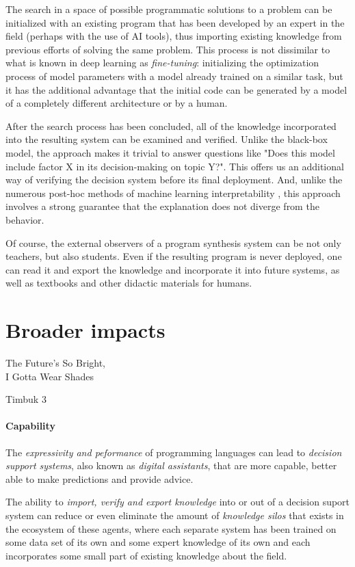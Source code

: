 The search in a space of possible programmatic solutions to a problem can be initialized with an existing program that has been developed by an expert in the field (perhaps with the  use of AI tools), thus \textcolor{accent}{importing existing knowledge} from previous efforts of solving the same problem.
This process is not dissimilar to what is known in deep learning as \emph{fine-tuning}: initializing the optimization process of model parameters with a model already trained on a similar task, but it has the additional advantage that the initial code can be generated by a model of a completely different architecture or by a human.

After the search process has been concluded, all of the knowledge incorporated into the resulting system can be \textcolor{accent}{examined and verified}. 
Unlike the black-box model, the approach makes it trivial to answer questions like "Does this model include factor X in its decision-making on topic Y?".
This offers us an additional way of verifying the decision system before its final deployment. 
And, unlike the numerous post-hoc methods of machine learning interpretability \cite{linardatosExplainableAiReview2020}, this approach involves a strong guarantee that the explanation does not diverge from the behavior.

Of course, the external observers of a program synthesis system can be not only teachers, but also students. 
Even if the resulting program is never deployed, one can read it and \textcolor{accent}{export the knowledge} and incorporate it into future systems, as well as textbooks and other didactic materials for humans.

\newpage
\section{Broader impacts}

\epigraph{The Future's So Bright, \\ I Gotta Wear Shades}{Timbuk 3}

\paragraph{Capability}

The \emph{expressivity and peformance} of programming languages can lead to \emph{decision support systems}, also known as \emph{digital assistants}, that are more capable, better able to make predictions and provide advice.

The ability to \emph{import, verify and export knowledge} into or out of a decision suport system can reduce or even eliminate the amount of \emph{knowledge silos} that exists in the ecosystem of these agents, where each separate system has been trained on some data set of its own and some expert knowledge of its own and each incorporates some small part of existing knowledge about the field. 

